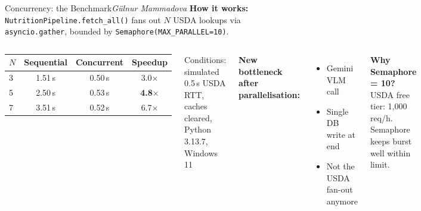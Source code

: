 \documentclass[aspectratio=169,10pt]{beamer}
\newcommand{\speaker}[1]{\hfill{\normalfont\footnotesize\itshape #1}}
\begin{document}
\begin{frame}{Concurrency: the Benchmark\speaker{Gülnur Mammadova}}
  \small
  \textbf{How it works:}
  \texttt{NutritionPipeline.fetch\_all()} fans out \(N\) USDA lookups via
  \texttt{asyncio.gather}, bounded by \texttt{Semaphore(MAX\_PARALLEL=10)}.

  \vspace{0.5em}
  \begin{columns}[T,onlytextwidth]
    \begin{center}\small
    \begin{tabular}{lccc}
      \toprule
      $N$ & \textbf{Sequential} & \textbf{Concurrent} & \textbf{Speedup} \\
      \midrule
      3 & 1.51\,s & 0.50\,s & 3.0\(\times\) \\
      5 & 2.50\,s & 0.53\,s & \textbf{4.8\(\times\)} \\
      7 & 3.51\,s & 0.52\,s & 6.7\(\times\) \\
      \bottomrule
    \end{tabular}
    \end{center}
    {\footnotesize Conditions: simulated 0.5\,s USDA RTT, caches cleared, Python 3.13.7, Windows 11}

    \textbf{New bottleneck after parallelisation:}
    \begin{itemize}\setlength\itemsep{0.25em}
      \item Gemini VLM call
      \item Single DB write at end
      \item Not the USDA fan-out anymore
    \end{itemize}

    \vspace{0.4em}
    \textbf{Why Semaphore = 10?}\\
    USDA free tier: 1,000 req/h. Semaphore keeps burst well within limit.
  \end{columns}
\end{frame}
\end{document}
